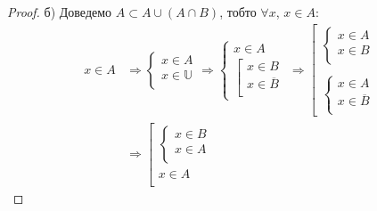 \begin{example}
\begin{proof}
        б) Доведемо $A \subset A \cup (A \cap B)$, тобто $\forall x$, $x \in A$:
        \begin{equation*}
            \begin{split}
                x \in A
                & \Rightarrow \left\{ \begin{array}{l}
                    x \in A  \\
                    x \in \mathbb{U}  \\
                \end{array} \right.
                \Rightarrow \left\{ \begin{array}{l}
                    x \in A  \\
                    \left[ \begin{array}{l}
                        x \in B  \\
                        x \in \overline{B}  \\
                    \end{array} \right.
                \end{array} \right.
                \Rightarrow \left[ \begin{array}{l}
                    \left\{ \begin{array}{l}
                        x \in A  \\
                        x \in B  \\
                    \end{array} \right.  \\
                    \\
                    \left\{ \begin{array}{l}
                        x \in A  \\
                        x \in \overline{B}  \\
                    \end{array} \right.
                \end{array} \right.  \\
                & \Rightarrow \left[ \begin{array}{l}
                    \left\{ \begin{array}{l}
                        x \in B  \\
                        x \in A  \\
                    \end{array} \right.  \\
                    x \in A  \\

\end{array}
\end{split}
\end{equation*}
\end{proof}
\end{example}
